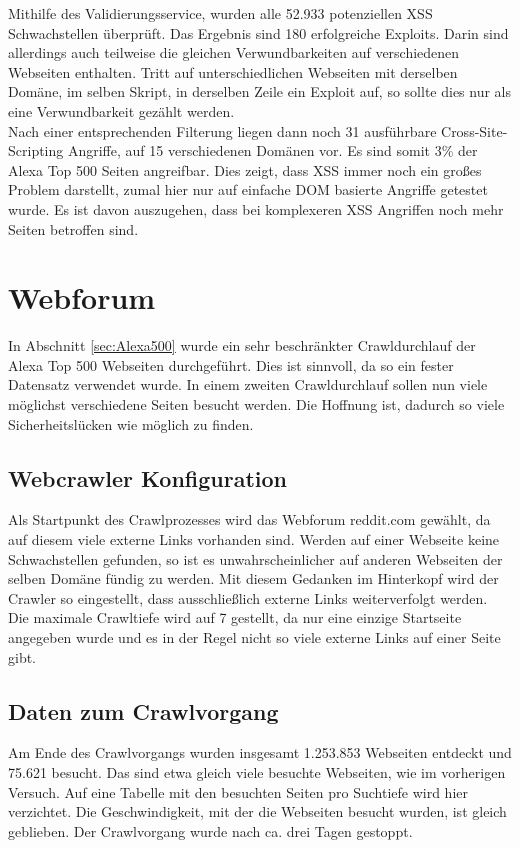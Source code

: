 Mithilfe des Validierungsservice, wurden alle 52.933 potenziellen XSS Schwachstellen überprüft. Das Ergebnis sind 180 erfolgreiche Exploits. Darin sind allerdings auch teilweise die gleichen Verwundbarkeiten auf verschiedenen Webseiten enthalten. Tritt auf unterschiedlichen Webseiten mit derselben Domäne, im selben Skript, in derselben Zeile ein Exploit auf, so sollte dies nur als eine Verwundbarkeit gezählt werden. \\
Nach einer entsprechenden Filterung liegen dann noch 31 ausführbare Cross-Site-Scripting Angriffe, auf 15 verschiedenen Domänen vor. Es sind somit 3\% der Alexa Top 500 Seiten angreifbar. Dies zeigt, dass XSS immer noch ein großes Problem darstellt, zumal hier nur auf einfache DOM basierte Angriffe getestet wurde. Es ist davon auszugehen, dass bei komplexeren XSS Angriffen noch mehr Seiten betroffen sind.

\section{Webforum}
In Abschnitt \ref{sec:Alexa500} wurde ein sehr beschränkter Crawldurchlauf der Alexa Top 500 Webseiten durchgeführt. Dies ist sinnvoll, da so ein fester Datensatz verwendet wurde. In einem zweiten Crawldurchlauf sollen nun viele möglichst verschiedene Seiten besucht werden. Die Hoffnung ist, dadurch so viele Sicherheitslücken wie möglich zu finden.
\subsection{Webcrawler Konfiguration}
Als Startpunkt des Crawlprozesses wird das Webforum reddit.com gewählt, da auf diesem viele externe Links vorhanden sind. Werden auf einer Webseite keine Schwachstellen gefunden, so ist es unwahrscheinlicher auf anderen Webseiten der selben Domäne fündig zu werden. Mit diesem Gedanken im Hinterkopf wird der Crawler so eingestellt, dass ausschließlich externe Links weiterverfolgt werden. \\
Die maximale Crawltiefe wird auf 7 gestellt, da nur eine einzige Startseite angegeben wurde und es in der Regel nicht so viele externe Links auf einer Seite gibt.
\subsection{Daten zum Crawlvorgang}
Am Ende des Crawlvorgangs wurden insgesamt 1.253.853 Webseiten entdeckt und 75.621 besucht. Das sind etwa gleich viele besuchte Webseiten, wie im vorherigen Versuch. Auf eine Tabelle mit den besuchten Seiten pro Suchtiefe wird hier verzichtet. Die Geschwindigkeit, mit der die Webseiten besucht wurden, ist gleich geblieben. Der Crawlvorgang wurde nach ca. drei Tagen gestoppt.
